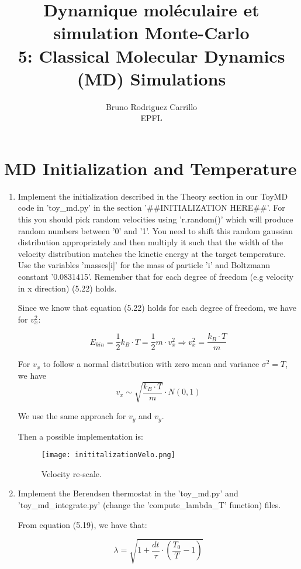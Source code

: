 \documentclass[12pt,letterpaper]{report}
\title{ Dynamique moléculaire et simulation Monte-Carlo \\ 5: Classical Molecular Dynamics (MD) Simulations}
\author{Bruno Rodriguez Carrillo \\ EPFL}
\begin{document}
	
	\maketitle
	\section*{MD Initialization and Temperature}
	
	\begin{enumerate}
		\item 
		Implement the initialization described in the Theory section in our ToyMD code in 'toy\_md.py' in the section '\#\#INITIALIZATION HERE\#\#'. For this you should pick random velocities using 'r.random()' which will produce random numbers between '0' and '1'. You need to shift this random gaussian distribution appropriately and then multiply it such that the width of the velocity distribution matches the kinetic energy at the target temperature. Use the variables 'masses[i]' for the mass of particle 'i' and Boltzmann constant '0.0831415'. Remember that for each degree of freedom (e.g velocity in x direction) (5.22) holds.
		
		Since we know that equation (5.22) holds for each degree of freedom, we have for $v^{2}_{x}$:
		
		$$
			E_{kin} = \dfrac{1}{2} k_{B}\cdot T = \dfrac{1}{2} m \cdot v^{2}_{x} \Rightarrow
			v^{2}_{x} = \dfrac{k_{B}\cdot T}{m}
		$$
		
		For $v_{x}$ to follow a normal distribution with zero mean and variance $\sigma^{2} = T$, we have 
		$$
			v_{x} \sim \sqrt{\dfrac{k_{B}\cdot T}{m}} \cdot N(0, 1)
		$$		
		
		We use the same approach for $v_{y}$ and $v_{y}$.
		
		Then a possible implementation is: 
		
		\begin{figure}[H]
			\centering
			\texttt{[image: inititalizationVelo.png]}		
			\caption{Velocity re-scale.}
			\label{fig::inititalizationVelo}
		\end{figure}  

		\item
		Implement the Berendsen thermostat in the 'toy\_md.py' and 'toy\_md\_integrate.py' (change the 'compute\_lambda\_T' function) files.
		
		From equation (5.19), we have that:
		
		$$
			\lambda = \sqrt{ 1 + \dfrac{dt}{\tau} \cdot \left( \dfrac{T_{0} }{T} - 1 \right) }
		$$
		

\end{enumerate}
\end{document}
